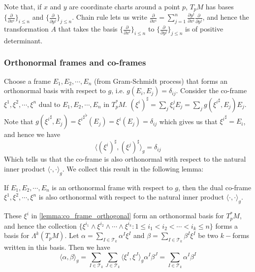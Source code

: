 Note that, if $x$
and $y$ are coordinate charts around a point $p$, $T_pM$ has bases $\{\frac{\partial }{\partial x^i}\}_{i\leq n}$ and $\{\frac{\partial}{\partial y^j}\}_{j\leq n}$. Chain rule lets us write $\frac{\partial}{\partial x^i}=\sum_{j=1}^n \frac{\partial y^j}{\partial x^i} \frac{\partial}{\partial y^j}$, and hence the transformation $A$ that takes the basis $\{\frac{\partial}{\partial x^i}\}_{i\leq n}$ to $\{\frac{\partial}{\partial y^j}\}_{j\leq n}$ is of positive determinant.

\subsubsection{Orthonormal frames and co-frames}
Choose a frame $E_1,E_2,\cdots,E_n$ (from Gram-Schmidt process) that forms an orthonormal basis with respect to $g$, i.e. $g(E_i,E_j)=\delta_{ij}$. Consider the co-frame $\xi^1,\xi^2,\cdots,\xi^n$ dual to $E_1,E_2,\cdots, E_n$ in $T_p^*M$. $(\xi^i)^{\sharp}=\sum_j \xi_i^j E_j=\sum_j g({\xi^i}^{\sharp},E_j)E_j$. Note that $g({\xi^i}^{\sharp},E_j)={{\xi^i}^{\sharp}}^{\flat}(E_j)=\xi^i(E_j)=\delta_{ij}$ which gives us that ${\xi^i}^{\sharp}=E_i$, and hence we have $$\langle(\xi^i)^{\sharp},(\xi^j)^\sharp\rangle_g=\delta_{ij} $$
Which tells us that the co-frame is also orthonormal with respect to the natural inner product $\langle \cdot ,\cdot \rangle_g$. We collect this result in the following lemma:

\begin{lemma}{\label{lemma:co_frame_orthogonal} If $E_1,E_2,\cdots,E_n$ is an orthonormal frame with respect to $g$, then the dual co-frame $\xi^1,\xi^2,\cdots,\xi^n$ is also orthonormal with respect to the natural inner product $\langle\cdot,\cdot \rangle_g  $.}\end{lemma}

These $\xi^i$ in \ref{lemma:co_frame_orthogonal} form an orthonormal basis for $T_p^*M$, and hence the collection $\{\xi^{i_1}\wedge \xi^{i_2}\wedge \cdots \wedge \xi^{i_k}:1\leq i_1<i_2<\cdots<i_k\leq n\}$ forms a basis for $\Lambda^k(T_pM)$. Let $\alpha=\sum_{I\in \mathscr T_k} \alpha^I \xi^I$ and $\beta=\sum_{I\in \mathscr T_k} \beta^I \xi^I$ be two $k-$forms written in this basis. Then we have \begin{equation}\label{eq:inner_product_of_k_forms_in_ON_basis}
    \langle \alpha,\beta\rangle_g=\sum_{I\in \mathscr T_k}\sum_{J\in \mathscr T_k}\langle\xi^I,\xi^J\rangle_g\alpha^I\beta^J=\sum_{I\in \mathscr T_k}\alpha^I\beta^I
\end{equation}


